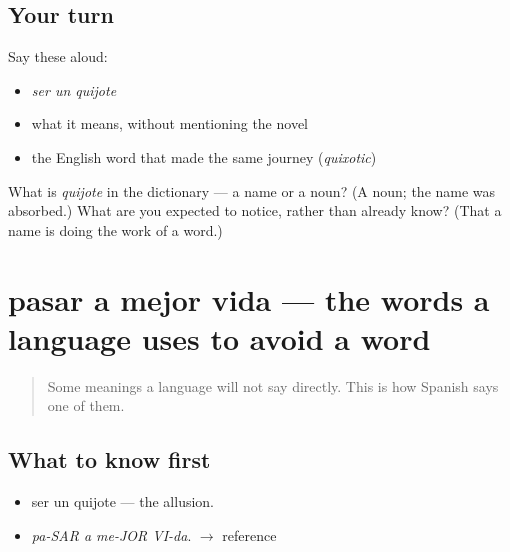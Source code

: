 \subsection*{Your turn}
Say these aloud:

\begin{itemize}
\raggedright
  \item \emph{ser un quijote}
  \item what it means, without mentioning the novel
  \item the English word that made the same journey (\emph{quixotic})
\end{itemize}

\begin{tcolorbox}[breakable,colback=teal!4,colframe=teal!35!black,title={Before you move on}]
What is \emph{quijote} in the dictionary — a name or a noun? (A noun; the name was absorbed.) What are you expected to notice, rather than already know? (That a name is doing the work of a word.)
\end{tcolorbox}
\section[pasar a mejor vida]{pasar a mejor vida — the words a language uses to avoid a word}

\label{lesson:ES-C274-pasar-a-mejor-vida}



\begin{quote}
Some meanings a language will not say directly. This is how Spanish says one of them.
\end{quote}

\subsection*{What to know first}
\begin{itemize}
\raggedright
  \item ser un quijote — the allusion.
\end{itemize}

\begin{sounds}
\begin{itemize}
\raggedright
  \item \emph{pa-SAR a me-JOR VI-da}. $\to$ reference
\end{itemize}
\end{sounds}

